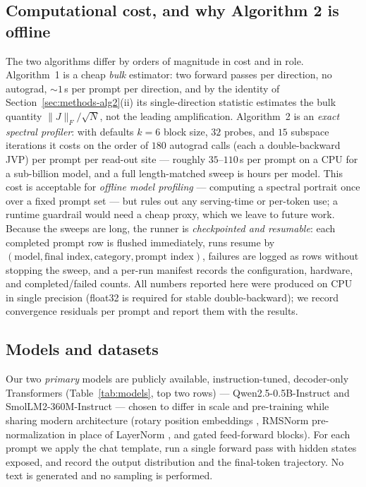 \documentclass{article}
\begin{document}
\subsection{Computational cost, and why Algorithm 2 is offline}
\label{sec:methods-cost}
The two algorithms differ by orders of magnitude in cost and in role. Algorithm~1 is a cheap
\emph{bulk} estimator: two forward passes per direction, no autograd, $\sim\!1$\,s per prompt
per direction, and by the identity of Section~\ref{sec:methods-alg2}(ii) its single-direction
statistic estimates the bulk quantity $\|J\|_F/\sqrt N$, not the leading amplification.
Algorithm~2 is an \emph{exact spectral profiler}: with defaults $k{=}6$ block size, $32$ probes,
and $15$ subspace iterations it costs on the order of $180$ autograd calls (each a
double-backward JVP) per prompt per read-out site --- roughly $35$--$110$\,s per prompt on a CPU
for a sub-billion model, and a full length-matched sweep is hours per model. This cost is
acceptable for \emph{offline model profiling} --- computing a spectral portrait once over a
fixed prompt set --- but rules out any serving-time or per-token use; a runtime guardrail would
need a cheap proxy, which we leave to future work. Because the sweeps are long, the runner is
\emph{checkpointed and resumable}: each completed prompt row is flushed immediately, runs resume
by $(\text{model},\text{final index},\text{category},\text{prompt index})$, failures are logged
as rows without stopping the sweep, and a per-run manifest records the configuration, hardware,
and completed/failed counts. All numbers reported here were produced on CPU in single precision
(float32 is required for stable double-backward); we record convergence residuals per prompt and
report them with the results.

\subsection{Models and datasets}
\label{sec:methods-data}

Our two \emph{primary} models are publicly available, instruction-tuned, decoder-only Transformers
(Table~\ref{tab:models}, top two rows) --- Qwen2.5-0.5B-Instruct \cite{qwen2025technical} and
SmolLM2-360M-Instruct \cite{allal2025smollm2} --- chosen to differ in scale and pre-training while sharing modern
architecture (rotary position embeddings \cite{su2024roformer}, RMSNorm pre-normalization
\cite{zhang2019root} in place of LayerNorm \cite{ba2016layer}, and gated feed-forward blocks).
For each
prompt we apply the chat template, run a single forward pass with hidden states exposed, and
record the output distribution and the final-token trajectory. No text is generated and no
sampling is performed.
\end{document}
